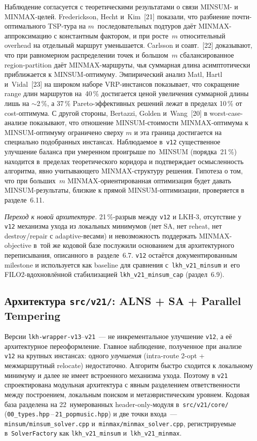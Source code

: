 \documentclass[14pt,a4paper]{extarticle}
\newcommand{\source}[1]{[#1]}
\begin{document}
Наблюдение согласуется с теоретическими результатами о связи MINSUM- и MINMAX-целей. Frederickson, Hecht и~Kim~\source{21} показали, что разбиение почти-оптимального TSP-тура на $m$~последовательных подтуров даёт MINMAX-аппроксимацию с константным фактором, и при росте~$m$ относительный overhead на отдельный маршрут уменьшается. Carlsson и соавт.~\source{22} доказывают, что при равномерном распределении точек и большом~$m$ сбалансированное region-partition даёт MINMAX-маршруты, чья суммарная длина асимптотически приближается к MINSUM-оптимуму. Эмпирический анализ Matl, Hartl и~Vidal~\source{23} на широком наборе VRP-инстансов показывает, что сокращение range длин маршрутов на~40\,\% достигается ценой увеличения суммарной длины лишь на $\sim$2\,\%, а 37\,\% Pareto-эффективных решений лежат в пределах 10\,\% от cost-оптимума. С другой стороны, Bertazzi, Golden и~Wang~\source{20} в worst-case-анализе показывают, что отношение MINSUM-стоимости MINMAX-оптимума к MINSUM-оптимуму ограничено сверху $m$ и эта граница достигается на специально подобранных инстансах. Наблюдаемое в~\texttt{v12} существенное улучшение баланса при умеренном проигрыше по~MINSUM (порядка~21\,\%) находится в~пределах теоретического коридора и подтверждает осмысленность алгоритма, явно учитывающего MINMAX-структуру решения. Гипотеза о том, что при больших~$m$ MINMAX-ориентированная оптимизация будет давать MINSUM-результаты, близкие к прямой MINSUM-оптимизации, проверяется в разделе~6.11.

\textit{Переход к новой архитектуре.} 21\,\%-разрыв между \texttt{v12} и LKH-3, отсутствие у \texttt{v12} механизма ухода из локальных минимумов (нет SA, нет reheat, нет destroy/repair с adaptive-весами) и невозможность поддержать MINMAX-objective в~той же кодовой базе послужили основанием для архитектурного переписывания, описанного в~разделе~6.7. \texttt{v12} остаётся документированным milestone и используется как baseline для сравнения с~\texttt{lkh\_v21\_minsum} и~его FILO2-вдохновлённой стабилизацией \texttt{lkh\_v21\_minsum\_cap} (раздел~6.9).


\subsection{Архитектура \texttt{src/v21/}: ALNS + SA + Parallel Tempering}

Версии \texttt{lkh-wrapper-v13}--\texttt{v21}~--- не инкрементальное улучшение \texttt{v12}, а её архитектурное переоформление. Главное наблюдение, полученное при анализе \texttt{v12} на крупных инстансах: одного \emph{улучшения} (intra-route 2-opt + межмаршрутный relocate) недостаточно. Алгоритм быстро сходится к локальному минимуму и далее не имеет встроенного механизма ухода. Поэтому в \texttt{v21} спроектирована модульная архитектура с явным разделением ответственности между построением, локальным поиском и метаэвристическим уровнем. Кодовая база разделена на 22~нумерованных header-only-модуля в~\texttt{src/v21/core/} (\texttt{00\_types.hpp}\,--\,\texttt{21\_popmusic.hpp}) и две точки входа~--- \texttt{minsum/minsum\_solver.cpp} и~\texttt{minmax/minmax\_solver.cpp}, регистрируемые в~\texttt{SolverFactory} как \texttt{lkh\_v21\_minsum} и~\texttt{lkh\_v21\_minmax}.
\end{document}
